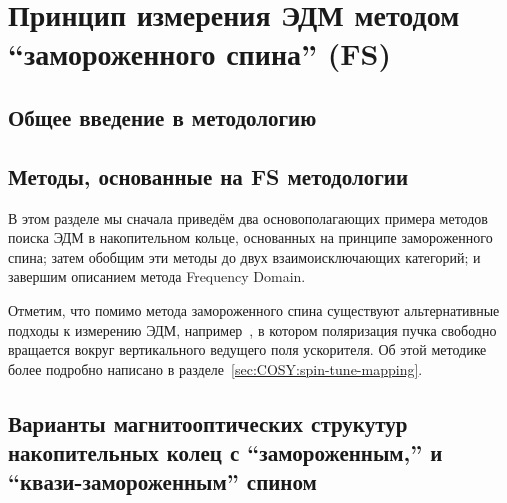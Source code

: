\chapter{Принцип измерения ЭДМ методом ``замороженного спина'' (FS)}\label{chpt1:top-level}

\section{Общее введение в методологию}\label{chpt1:FS-introduction}


\section{Методы, основанные на FS методологии}\label{chpt1:FS-methods}
В этом разделе мы сначала приведём два основополагающих примера методов поиска ЭДМ
в накопительном кольце, основанных на принципе замороженного спина;
затем обобщим  эти методы до двух взаимоисключающих категорий;
и завершим описанием метода Frequency Domain.

Отметим, что помимо метода замороженного спина существуют альтернативные подходы к измерению ЭДМ, например~\cite{COSY:SpinTuneMapping, COSY:Partially-Frozen-Spin}, в котором поляризация пучка свободно вращается вокруг вертикального ведущего поля ускорителя. Об этой методике более подробно написано в разделе~\ref{sec:COSY:spin-tune-mapping}.



\section{Варианты магнитооптических струкутур накопительных колец с ``замороженным,'' и ``квази-замороженным'' спином} \label{chpt1:Lattices}



\clearpage